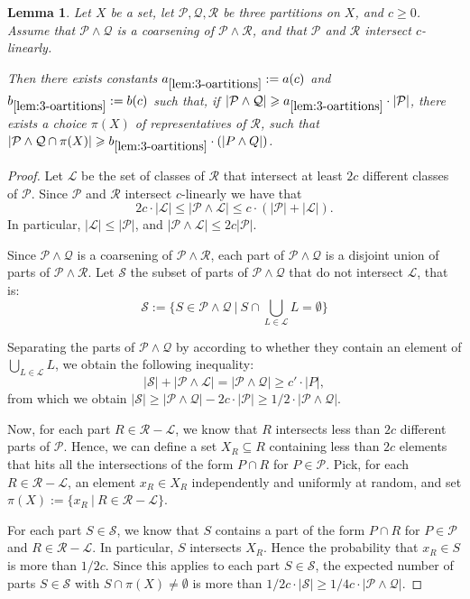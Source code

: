 \documentclass[11pt]{article}
\newtheorem{lemma}[theorem]{Lemma}
\theoremstyle{definition}
\newcommand{\QQ}{{\mathcal Q}}
\newcommand{\PP}{{\mathcal P}}
\renewcommand{\le}{\leqslant}
\renewcommand{\ge}{\geqslant}
\renewcommand{\subset}{\subseteq}
\renewcommand{\cal}{\mathcal}
\newcommand{\Pp}{\mathcal{P}}
\newcommand{\Qq}{\mathcal{Q}}
\begin{document}
\begin{lemma}\label{lem:3-oartitions}
Let $X$ be a set, let $\PP, \Qq, \mathcal R$ be three partitions on $X$, and $c \ge 0$.
Assume that $\PP \wedge \QQ$ is a coarsening of $\PP \wedge \mathcal R$, and that $\PP$ and $\mathcal R$ intersect $c$-linearly.

Then there exists constants $a_{\ref{lem:3-oartitions}} := a(c)$ and $b_{\ref{lem:3-oartitions}} := b(c)$ such that, if $|\Pp \wedge \QQ| \ge a_{\ref{lem:3-oartitions}} \cdot |\PP|$, there exists a choice $\pi(X)$ of representatives of $\mathcal R$, such that $|\PP \wedge \QQ \cap \pi(X)| \ge b_{\ref{lem:3-oartitions}} \cdot (|P \wedge Q|)$.
\end{lemma}
\begin{proof}
Let $\cal L$ be the set of classes of $\cal R$ that intersect at least $2c$ different classes of $\PP$.
Since $\PP$ and $\cal R$ intersect $c$-linearly we have that
\[
2c \cdot |\mathcal{L}| \le |\PP \wedge \mathcal{L}| \le c \cdot (|\PP| + |\mathcal L|).
\]
In particular, $|\mathcal L| \le |\PP|$, and $|\PP \wedge \mathcal{L}| \le 2c |\PP|$. 

Since $\PP \wedge \QQ$ is a coarsening of $\PP \wedge \mathcal R$, each part of $\PP \wedge \QQ$ is a disjoint union of parts of $\PP \wedge \mathcal R$.
Let $\mathcal S$ the subset of parts of $\PP \wedge \QQ$ that do not intersect $\mathcal L$, that is:
\[
\mathcal S := \{ S \in \PP \wedge \QQ ~|~ S \cap \bigcup_{L \in \mathcal L} L = \emptyset \}
\]

Separating the parts of $\PP \wedge \QQ$ by according to whether they contain an element of $\bigcup_{L \in \mathcal L} L$, we obtain the following inequality:
\[
|\mathcal S| + |\PP \wedge \mathcal L| = |\PP \wedge \mathcal Q| \ge  c' \cdot |P|,
\]
from which we obtain $|\mathcal S| \ge |\PP \wedge \mathcal Q| - 2c \cdot |\mathcal P| \ge 1/2 \cdot |\PP \wedge \mathcal Q|$.

Now, for each part $R \in \mathcal R - \mathcal L$, we know that $R$ intersects less than $2c$ different parts of $\PP$.
Hence, we can define a set $X_R \subset R$ containing less than $2c$ elements that hits all the intersections of the form $P \cap R$ for $P \in \PP$.
Pick, for each $R \in \mathcal R - \mathcal L$, an element $x_R \in X_R$ independently and uniformly at random, and set $\pi(X) := \{ x_R ~|~ R \in \mathcal R - \mathcal L\}$.

For each part $S \in \mathcal S$, we know that $S$ contains a part of the form $P \cap R$ for $P \in \PP$ and $R \in \mathcal R - \mathcal L$. In particular, $S$ intersects $X_R$. Hence the probability that $x_R \in S$ is more than $1/2c$.
Since this applies to each part $S \in \mathcal S$, the expected number of parts $S \in \mathcal S$ with $S \cap \pi(X) \neq \emptyset$ is more than $1/2c \cdot |\mathcal S| \ge 1/4c \cdot |\PP \wedge \QQ|$.
\end{proof}
\end{document}
